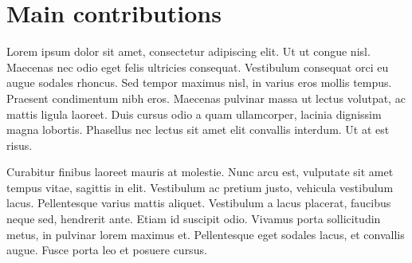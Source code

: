 \section{Main contributions}\label{contributions}

Lorem ipsum dolor sit amet, consectetur adipiscing elit. Ut ut congue nisl. Maecenas nec odio eget felis ultricies consequat. Vestibulum consequat orci eu augue sodales rhoncus. Sed tempor maximus nisl, in varius eros mollis tempus. Praesent condimentum nibh eros. Maecenas pulvinar massa ut lectus volutpat, ac mattis ligula laoreet. Duis cursus odio a quam ullamcorper, lacinia dignissim magna lobortis. Phasellus nec lectus sit amet elit convallis interdum. Ut at est risus.

Curabitur finibus laoreet mauris at molestie. Nunc arcu est, vulputate sit amet tempus vitae, sagittis in elit. Vestibulum ac pretium justo, vehicula vestibulum lacus. Pellentesque varius mattis aliquet. Vestibulum a lacus placerat, faucibus neque sed, hendrerit ante. Etiam id suscipit odio. Vivamus porta sollicitudin metus, in pulvinar lorem maximus et. Pellentesque eget sodales lacus, et convallis augue. Fusce porta leo et posuere cursus.
